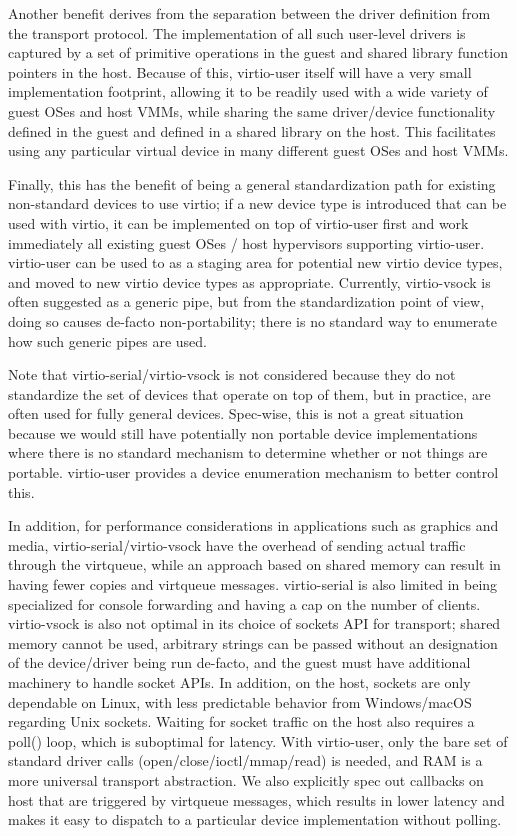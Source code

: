 Another benefit derives from
the separation between the driver definition from the transport protocol.
The implementation of all such user-level drivers
is captured by a set of primitive operations in the guest
and shared library function pointers in the host.
Because of this, virtio-user itself will have a very small implementation footprint,
allowing it to be readily used with a wide variety of guest OSes and host VMMs,
while sharing the same driver/device functionality
defined in the guest and defined in a shared library on the host.
This facilitates using any particular virtual device in many different guest OSes and host VMMs.

Finally, this has the benefit of being
a general standardization path for existing non-standard devices to use virtio;
if a new device type is introduced that can be used with virtio,
it can be implemented on top of virtio-user first and work immediately
all existing guest OSes / host hypervisors supporting virtio-user.
virtio-user can be used to as a staging area for potential new
virtio device types, and moved to new virtio device types as appropriate.
Currently, virtio-vsock is often suggested as a generic pipe,
but from the standardization point of view,
doing so causes de-facto non-portability;
there is no standard way to enumerate how such generic pipes are used.

Note that virtio-serial/virtio-vsock is not considered
because they do not standardize the set of devices that operate on top of them,
but in practice, are often used for fully general devices.
Spec-wise, this is not a great situation because we would still have potentially
non portable device implementations where there is no standard mechanism to
determine whether or not things are portable.
virtio-user provides a device enumeration mechanism to better control this.

In addition, for performance considerations
in applications such as graphics and media,
virtio-serial/virtio-vsock have the overhead of sending actual traffic
through the virtqueue, while an approach based on shared memory
can result in having fewer copies and virtqueue messages.
virtio-serial is also limited in being specialized for console forwarding
and having a cap on the number of clients.
virtio-vsock is also not optimal in its choice of sockets API for
transport; shared memory cannot be used,
arbitrary strings can be passed without an designation of the device/driver being run de-facto,
and the guest must have additional machinery to handle socket APIs.
In addition, on the host, sockets are only dependable on Linux,
with less predictable behavior from Windows/macOS regarding Unix sockets.
Waiting for socket traffic on the host also requires a poll() loop,
which is suboptimal for latency.
With virtio-user, only the bare set of standard driver calls (open/close/ioctl/mmap/read) is needed,
and RAM is a more universal transport abstraction.
We also explicitly spec out callbacks on host that are triggered by virtqueue messages,
which results in lower latency and makes it easy to dispatch to a particular device implementation
without polling.

